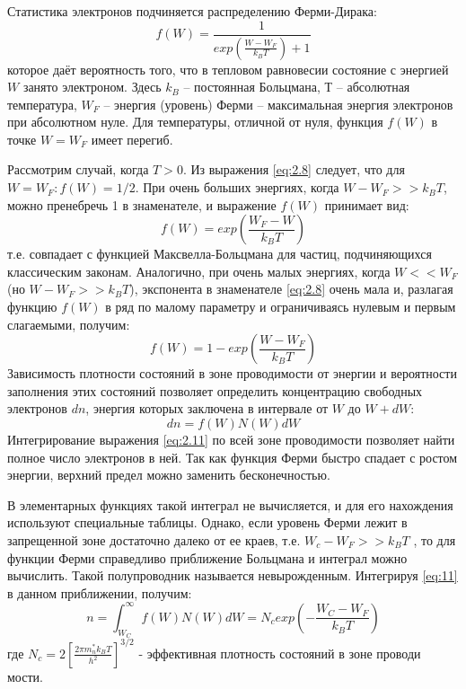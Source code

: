 Статистика электронов подчиняется распределению Ферми-Дирака:   
\begin{equation}
	f(W) = \frac{1}{exp (\frac{W-W_F}{k_B T})+1}
	\label{eq:2.8}
\end{equation}
которое даёт вероятность того, что в тепловом равновесии состояние с энергией $W$ занято электроном. Здесь $k_B$ –
постоянная Больцмана, $Т$ – абсолютная температура, $W_F$ – энергия (уровень) Ферми – максимальная энергия электронов при
абсолютном нуле. Для температуры, отличной от нуля, функция $f(W)$ в точке $W = W_F$ имеет перегиб.

Рассмотрим случай, когда $T > 0$. Из выражения \eqref{eq:2.8} следует, что для $W=W_F: f(W) =1/2$. При очень больших энергиях, когда 
$ W-W_F>> k_B T $, можно пренебречь 1 в знаменателе, и выражение $f(W)$ принимает вид:
\begin{equation}
	f(W) = exp (\frac{W_F-W}{k_B T})
	\label{eq:2.9}
\end{equation} 
т.е. совпадает с функцией Максвелла-Больцмана для частиц, подчиняющихся классическим законам. Аналогично, при очень
малых энергиях, когда $W<<W_F$ (но $W-W_F>>k_B T$), экспонента в знаменателе \eqref{eq:2.8} очень мала и, разлагая функцию $f(W)$ в ряд по
малому параметру и ограничиваясь нулевым и первым слагаемыми, получим: 
\begin{equation}
	f(W) = 1 - exp( \frac{W-W_F}{k_BT})
	\label{eq:2.10}
\end{equation}
Зависимость плотности состояний в зоне проводимости от энергии и вероятности заполнения этих состояний позволяет
определить концентрацию свободных электронов $dn$, энергия которых заключена в интервале от $W$ до $W+dW$:
\begin{equation}
	dn = f(W) N(W)dW
	\label{eq:2.11}
\end{equation}
Интегрирование выражения \eqref{eq:2.11} по всей зоне проводимости позволяет найти полное число электронов в ней. Так как функция
Ферми быстро спадает с ростом энергии, верхний предел можно заменить бесконечностью. 

В элементарных функциях такой интеграл не вычисляется, и для его нахождения используют специальные таблицы. Однако, если
уровень Ферми лежит в запрещенной зоне достаточно далеко от ее краев, т.е. $W_c - W_F>>k_B T$ , то для функции Ферми
справедливо приближение Больцмана и интеграл можно вычислить. Такой полупроводник называется невырожденным. Интегрируя
\eqref{eq:11} в данном приближении, получим: 
\begin{equation}
	n=\int_{W_{C}}^{\infty} f(W) N(W) d W=N_{c} exp(-\frac{W_C-W_F}{k_B T})
	\label{eq:2.12}
\end{equation}
где $N_{c}=2\left[\frac{2 \pi m_{n}^{*} k_{B} T}{h^{2}}\right]^{3 / 2}$ - эффективная плотность состояний в зоне проводи
мости.

